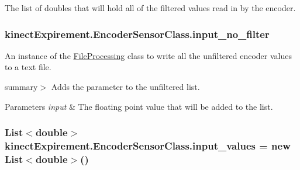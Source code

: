 The list of doubles that will hold all of the filtered values read in by the encoder. 

\subsubsection[{\texorpdfstring{input\+\_\+no\+\_\+filter}{input_no_filter}}]{ kinect\+Expirement.\+Encoder\+Sensor\+Class.\+input\+\_\+no\+\_\+filter\hspace{0.3cm}{\ttfamily [static]}}\hypertarget{classkinect_expirement_1_1_encoder_sensor_class_a37bd8f02067e70fcb1ae1c2a97e86aed}{}\label{classkinect_expirement_1_1_encoder_sensor_class_a37bd8f02067e70fcb1ae1c2a97e86aed}


An instance of the {\ttfamily \hyperlink{classkinect_expirement_1_1_file_processing}{File\+Processing}} class to write all the unfiltered encoder values to a text file. 

summary$>$ Adds the parameter to the unfiltered list. 


\begin{DoxyParams}{Parameters}
{\em input} & The floating point value that will be added to the list. \\
\hline
\end{DoxyParams}
\subsubsection[{\texorpdfstring{input\+\_\+values}{input_values}}]{\setlength{\rightskip}{0pt plus 5cm}List$<$double$>$ kinect\+Expirement.\+Encoder\+Sensor\+Class.\+input\+\_\+values = new List$<$double$>$()\hspace{0.3cm}{\ttfamily [static]}}\hypertarget{classkinect_expirement_1_1_encoder_sensor_class_ae6c3bb0efe3e841b985741bfa35dc8aa}{}\label{classkinect_expirement_1_1_encoder_sensor_class_ae6c3bb0efe3e841b985741bfa35dc8aa}


